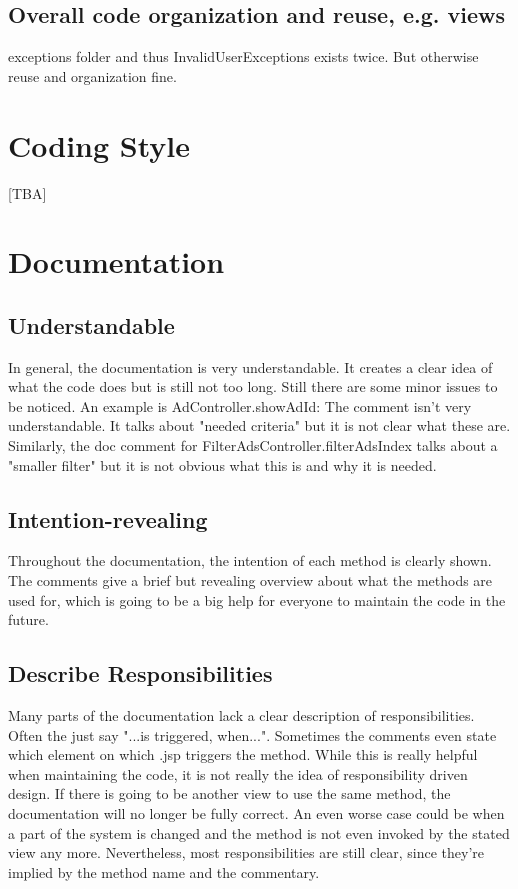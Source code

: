 \documentclass{scrreprt}
\begin{document}
\subsection{Overall code organization and reuse, e.g. views}
exceptions folder and thus InvalidUserExceptions exists twice. But otherwise reuse and organization fine.

\section{Coding Style}
[TBA]

\section{Documentation}
\subsection{Understandable}
In general, the documentation is very understandable. It creates a clear idea of what the code does but is still not too long. Still there are some minor issues to be noticed. An example is AdController.showAdId: The comment isn't very understandable. It talks about "needed criteria" but it is not clear what these are. Similarly, the doc comment for FilterAdsController.filterAdsIndex talks about a "smaller filter" but it is not obvious what this is and why it is needed. 

\subsection{Intention-revealing}
Throughout the documentation, the intention of each method is clearly shown. The comments give a brief but revealing overview about what the methods are used for, which is going to be a big help for everyone to maintain the code in the future.

\subsection{Describe Responsibilities}
Many parts of the documentation lack a clear description of responsibilities. Often the just say "...is triggered, when...". Sometimes the comments even state which element on which .jsp triggers the method. While this is really helpful when maintaining the code, it is not really the idea of responsibility driven design. If there is going to be another view to use the same method, the documentation will no longer be fully correct. An even worse case could be when a part of the system is changed and the method is not even invoked by the stated view any more. Nevertheless, most responsibilities are still clear, since they're implied by the method name and the commentary. 
\end{document}
